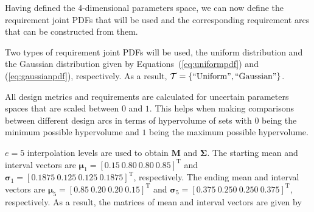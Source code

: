 Having defined the 4-dimensional parameters space, we can now define the requirement joint \acp{PDF} that will be used and the corresponding requirement arcs that can be constructed from them. 

Two types of requirement joint \acp{PDF} will be used, the uniform distribution and the Gaussian distribution given by Equations~(\ref{eq:uniformpdf}) and (\ref{eq:gaussianpdf}), respectively. As a result, $\mathcal{T} = \left\{\mathrm{``Uniform"},\mathrm{``Gaussian"}\right\}$.

All design metrics and requirements are calculated for uncertain parameters spaces that are scaled between $0$ and $1$. This helps when making comparisons between different design arcs in terms of hypervolume of sets with $0$ being the minimum possible hypervolume and $1$ being the maximum possible hypervolume.

$e=5$ interpolation levels are used to obtain $\mathbf{M}$ and $\boldsymbol{\Sigma}$. The starting mean and interval vectors are $\boldsymbol{\mu}_1 = \left[0.15 ~ 0.80 ~ 0.80 ~ 0.85\right]^{\mathrm{T}}$ and $\boldsymbol{\sigma}_1 = \left[0.1875 ~ 0.125 ~ 0.125 ~ 0.1875\right]^{\mathrm{T}}$, respectively. The ending mean and interval vectors are $\boldsymbol{\mu}_5 = \left[0.85 ~ 0.20 ~ 0.20 ~ 0.15\right]^{\mathrm{T}}$ and $\boldsymbol{\sigma}_5 = \left[0.375 ~ 0.250 ~ 0.250 ~ 0.375\right]^{\mathrm{T}}$, respectively. As a result, the matrices of mean and interval vectors are given by



